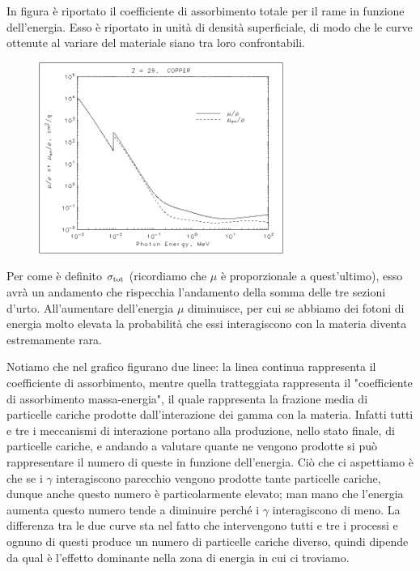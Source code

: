 \begin{esempio}
    In figura è riportato il coefficiente di assorbimento totale per il rame in funzione dell'energia. Esso è riportato in unità di densità superficiale, di modo che le curve ottenute al variare del materiale siano tra loro confrontabili.
    \begin{figure}[H]
        \centering
        \includegraphics[width=8cm]{immagini/coefficiente_assorbimento_gamma_rame.png}
    \end{figure}
    Per come è definito $\sigma_{\rm tot}$ (ricordiamo che $\mu$ è proporzionale a quest'ultimo), esso avrà un andamento che rispecchia l'andamento della somma delle tre sezioni d'urto. All'aumentare dell'energia $\mu$ diminuisce, per cui se abbiamo dei fotoni di energia molto elevata la probabilità che essi interagiscono con la materia diventa estremamente rara.
    
    Notiamo che nel grafico figurano due linee: la linea continua rappresenta il coefficiente di assorbimento, mentre quella tratteggiata rappresenta il "coefficiente di assorbimento massa-energia", il quale rappresenta la frazione media di particelle cariche prodotte dall'interazione dei gamma con la materia. Infatti tutti e tre i meccanismi di interazione portano alla produzione, nello stato finale, di particelle cariche, e andando a valutare quante ne vengono prodotte si può rappresentare il numero di queste in funzione dell'energia. Ciò che ci aspettiamo è che se i $\gamma$ interagiscono parecchio vengono prodotte tante particelle cariche, dunque anche questo numero è particolarmente elevato; man mano che l'energia aumenta questo numero tende a diminuire perché i $\gamma$ interagiscono di meno. La differenza tra le due curve sta nel fatto che intervengono tutti e tre i processi e ognuno di questi produce un numero di particelle cariche diverso, quindi dipende da qual è l'effetto dominante nella zona di energia in cui ci troviamo.
\end{esempio}


